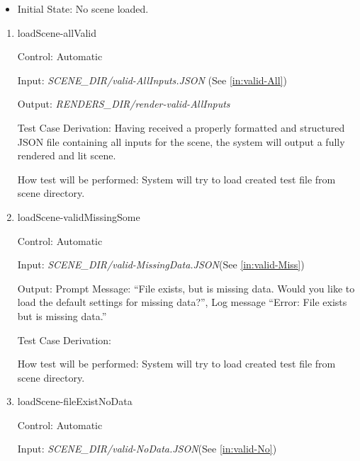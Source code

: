 \documentclass[12pt, titlepage]{article}
\begin{document}
\begin{itemize}
	\item[] Initial State: No scene loaded.
\end{itemize}

\begin{enumerate}

\item{loadScene-allValid\\}

Control: Automatic
								
Input: \textit{SCENE\_DIR/valid-AllInputs.JSON} (See \ref{in:valid-All})
					
Output: \textit{RENDERS\_DIR/render-valid-AllInputs} 

Test Case Derivation: Having received a properly formatted and structured JSON 
file containing all inputs for the scene, the system will output a fully 
rendered and lit scene.
					
How test will be performed: System will try to load created test file from 
scene directory. 
					
\item{loadScene-validMissingSome\\}

Control: Automatic

Input: \textit{SCENE\_DIR/valid-MissingData.JSON}(See \ref{in:valid-Miss})

Output: Prompt Message: ``File exists, but is missing data. Would you like to 
load the default settings for missing data?'', Log message ``Error: File exists 
but is missing data.''

Test Case Derivation: 

How test will be performed: System will try to load created test file from 
scene directory.

\item{loadScene-fileExistNoData\\}

Control: Automatic
									
Input: \textit{SCENE\_DIR/valid-NoData.JSON}(See \ref{in:valid-No})


\end{enumerate}
\end{document}
